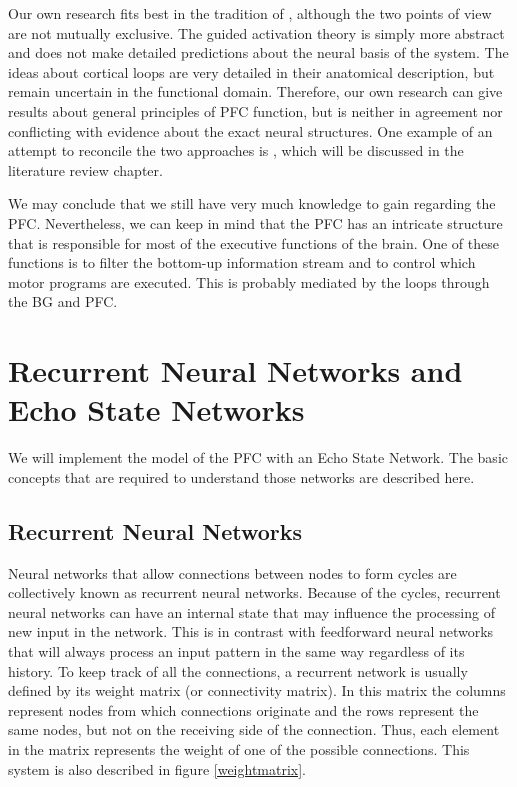 \documentclass[10pt,a4paper]{report}
\begin{document}
Our own research fits best in the tradition of \citet{Miller2001}, although the two points of view are not mutually exclusive. The guided activation theory is simply more abstract and does not make detailed predictions about the neural basis of the system. The ideas about cortical loops are very detailed in their anatomical description, but remain uncertain in the functional domain. Therefore, our own research can give results about general principles of PFC function, but is neither in agreement nor conflicting with evidence about the exact neural structures. One example of an attempt to reconcile the two approaches is \citet{Reynolds2009}, which will be discussed in the literature review chapter. 

We may conclude that we still have very much knowledge to gain regarding the PFC. Nevertheless, we can keep in mind that the PFC has an intricate structure that is responsible for most of the executive functions of the brain. One of these functions is to filter the bottom-up information stream and to control which motor programs are executed. This is probably mediated by the loops through the BG and PFC.

\section{Recurrent Neural Networks and Echo State Networks}
We will implement the model of the PFC with an Echo State Network. The basic concepts that are required to understand those networks are described here.

\subsection*{Recurrent Neural Networks}
Neural networks that allow connections between nodes to form cycles are collectively known as recurrent neural networks. Because of the cycles, recurrent neural networks can have an internal state that may influence the processing of new input in the network. This is in contrast with feedforward neural networks that will always process an input pattern in the same way regardless of its history. To keep track of all the connections, a recurrent network is usually defined by its weight matrix (or connectivity matrix). In this matrix the columns represent nodes from which connections originate and the rows represent the same nodes, but not on the receiving side of the connection. Thus, each element in the matrix represents the weight of one of the possible connections. This system is also described in figure \ref{weightmatrix}.
\end{document}
